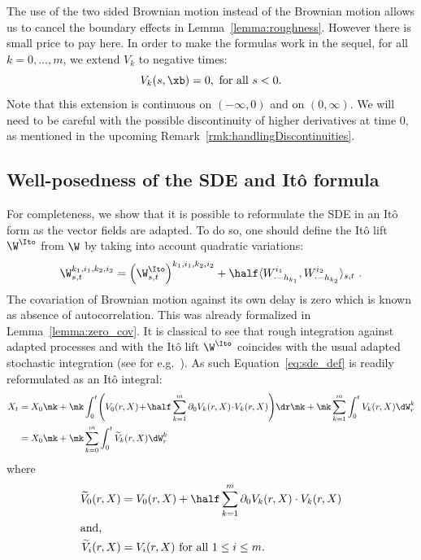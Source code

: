 \begin{rema}\label{rmk-extension}
The use of the two sided Brownian motion instead of the Brownian motion allows us to cancel the boundary effects in Lemma~\ref{lemma:roughness}. However there is small price to pay here. In order to make the formulas work in the sequel, for all $k=0,\dots,m$, we extend $V_k$ to negative times:
\[
V_k(s,\xb)=0,\text{ for all }s<0.
\]
Note that this extension is continuous on $(-\infty,0)$ and on $(0,\infty)$. We will need to be careful with the possible discontinuity of higher derivatives at time $0$, as mentioned in the upcoming Remark~\ref{rmk:handlingDiscontinuities}.
\end{rema}

\subsection{Well-posedness of the SDE and Itô formula}\label{subsection:wellposedness}
For completeness, we show that it is possible to reformulate the SDE in an Itô form as the vector fields are adapted. To do so, one should define the Itô lift $\W^{\Ito}$ from $\W$ by taking into account quadratic variations:
\[
\W_{s,t}^{k_1, i_1, k_2, i_2} = \left(\W^{\Ito}_{s,t} \right)^{k_1, i_1, k_2, i_2}
+ \half \langle W^{i_1}_{\cdot-h_{k_1}}, W^{i_2}_{\cdot-h_{k_2}} \rangle_{s,t} \ .
\]
The covariation of Brownian motion against its own delay is zero which is known as absence of autocorrelation. This was already formalized in Lemma~\ref{lemma:zero_cov}. It is classical to see that rough integration against adapted processes and with the Itô lift $\W^{\Ito}$ coincides with the usual adapted stochastic integration (see for e.g.~\cite[Proposition~5.1]{FH14}). As such Equation~\eqref{eq:sde_def} is readily reformulated as an Itô integral:
\begin{equation}\label{eq:sde_def_ito}
\begin{aligned}
X_t  &= X_0 \mk+\mk \int_0^t \!\left(V_0(r,X) \!+\! \half \sum_{k=1}^m \partial_0 V_k(r,X) \!\cdot\! V_k(r,X) \right)\!\dr \mk+\mk \sum_{k=1}^m \int_0^t V_k(r,X) \dW^k_r \\
&= X_0 \mk+\mk \sum_{k=0}^m \int_0^t \widetilde{V}_k(r,X) \dW^k_r \, 
\end{aligned}
\end{equation}
where
\begin{align*}
\widetilde V_0(r,X)&=V_0(r,X) + \half \sum_{k=1}^m \partial_0 V_k(r,X) \cdot V_k(r,X)\\ 
\intertext{and,} 
\widetilde V_i(r,X)&=V_i(r,X)\text{ for all } 1 \leq i \leq m.
\end{align*}
